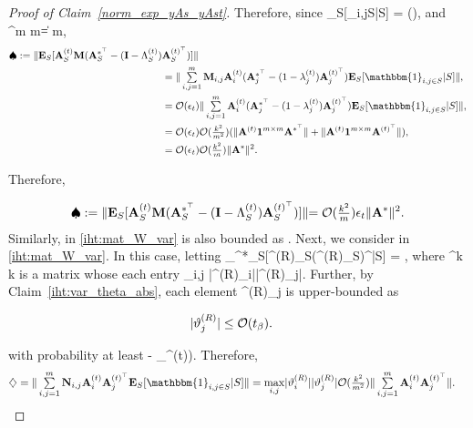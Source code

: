 \documentclass{article}
\newcommand{\siri}[1]{{\color{black}{#1}}}
\def\[#1\]{{$#1$}}
\def\b#1{{\mathbf{#1}}}
\begin{document}
\begin{proof}[Proof of Claim~\ref{norm_exp_yAs_yAst}]
	Therefore, since \[\b{E}_S[_{i,j\in S}|S] = ()\], and \[\|\b{1}^{m \times m}\| = m\],
	\begin{align*}
	\spadesuit 
	:=\|\b{E}_S[\b{A}^{(t)}_S\b{M}(\b{A}^{*^\top}_S  - (\b{I} - \Lambda^{(t)}_S)&\b{A}^{(t)^\top}_S)]\|\\
	&= \|\textstyle\sum\limits_{i,j = 1}^{m} \b{M}_{i,j}\b{A}^{(t)}_i(\b{A}^{*^\top}_j  - (1 - \lambda^{(t)}_j)\b{A}^{(t)^\top}_j) \b{E}_S[\mathbbm{1}_{i,j\in S}|S]\|,\\
	&= \mathcal{O}(\epsilon_t)\|\textstyle\sum\limits_{i,j = 1}^{m} \b{A}^{(t)}_i(\b{A}^{*^\top}_j  - (1 - \lambda^{(t)}_j)\b{A}^{(t)^\top}_j) \b{E}_S[\mathbbm{1}_{i,j\in S}|S]\|,\\
		&= \mathcal{O}(\epsilon_t)\mathcal{O}(\tfrac{k^2}{m^2})  (\|\b{A}^{(t)}\b{1}^{m \times m} \b{A}^{*^\top}\|  + \|\b{A}^{(t)}\b{1}^{m \times m} \b{A}^{(t)^\top}\|),\\
		&= \mathcal{O}(\epsilon_t)\mathcal{O}(\tfrac{k^2}{m}) \|\b{A}^{*}\|^2.
	

	\end{align*}
	
	Therefore,








	\begin{align*}
	\spadesuit:= \|\b{E}_S[\b{A}^{(t)}_S\b{M}(\b{A}^{*^\top}_S  - (\b{I} - \Lambda^{(t)}_S)\b{A}^{(t)^\top}_S)]\|
	
	
	\siri{ = \mathcal{O}(\tfrac{k^2}{m}) \epsilon_t\|\b{A}^{*}\|^2.}
	\end{align*}
	Similarly, \[\heartsuit\] in \eqref{iht:mat_W_var} is also bounded as \[\spadesuit\]. Next, we consider \[\diamondsuit\] in \eqref{iht:mat_W_var}. In this case, letting \[\b{E}_{\b{x}^*_S}[\vartheta^{(R)}_S(\vartheta^{(R)}_S)^\top|S] = \b{N}\], where \[\b{N} \in {}^{k \times k}\] is a matrix whose each entry \[\b{N}_{i,j} \leq |\vartheta^{(R)}_i||\vartheta^{(R)}_j|\]. Further, by Claim~\ref{iht:var_theta_abs}, each element \[\vartheta^{(R)}_{j}\] is upper-bounded as 
	
	
	
	
	
	
		   	\begin{align*}
		   	|\vartheta^{(R)}_{j}| 
		   	& \leq  \siri{\mathcal{O}(t_{\beta})}.
		   	\end{align*}
		   	
			with probability at least \[(1 - \delta_{\beta}^{(t)})\]. Therefore,
	\begin{align*}
	\diamondsuit 
	&= \|\textstyle\sum\limits_{i,j = 1}^{m} \b{N}_{i,j}\b{A}^{(t)}_i\b{A}^{(t)^\top}_j \b{E}_S[\mathbbm{1}_{i,j\in S}|S]\|=  \underset{i,j}{\max} |\vartheta^{(R)}_i||\vartheta^{(R)}_j|\mathcal{O}(\tfrac{k^2}{m^2}) \|\textstyle\sum\limits_{i,j = 1}^{m} \b{A}^{(t)}_i\b{A}^{(t)^\top}_j\|.
	



\end{align*}
\end{proof}
\end{document}

